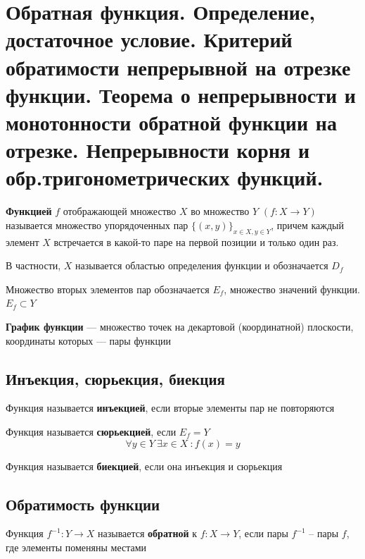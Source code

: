 \section{Обратная функция. Определение, достаточное условие. Критерий обратимости непрерывной на отрезке функции. Теорема о непрерывности и монотонности обратной функции на отрезке. Непрерывности корня и обр.тригонометрических функций.}

\begin{definition}
	\textbf{Функцией} $f$ отображающей множество $X$ во множество $Y$ $(f : X \to Y)$ называется множество упорядоченных пар $\{(x, y)\}_{x \in X, y \in Y}$, причем каждый элемент $X$ встречается в какой-то паре на первой позиции и только один раз.

	В частности, $X$ называется областью определения функции и обозначается $D_f$

	Множество вторых элементов пар обозначается $E_f$, множество значений функции. $E_f \subset Y$
\end{definition}

\begin{definition}
	\textbf{График функции} --- множество точек на декартовой (координатной) плоскости, координаты которых --- пары функции
\end{definition}
\subsection{Инъекция, сюрьекция, биекция} 
\begin{definition}
	Функция называется \textbf{инъекцией}, если вторые элементы пар не повторяются
\end{definition}
\begin{definition}
	Функция называется \textbf{сюрьекцией}, если $E_f = Y$
	\[
		\forall y \in Y\ \exists x \in X\ : f(x) = y
	\]
\end{definition}
\begin{definition}
	Функция называется \textbf{биекцией}, если она инъекция и сюрьекция
\end{definition}
\subsection{Обратимость функции}
\begin{definition}
	Функция $f^{-1} : Y \to X$ называется \textbf{обратной} к $f : X \to Y$, если пары $f^{-1}$ -- пары $f$, где элементы поменяны местами 
\end{definition}

